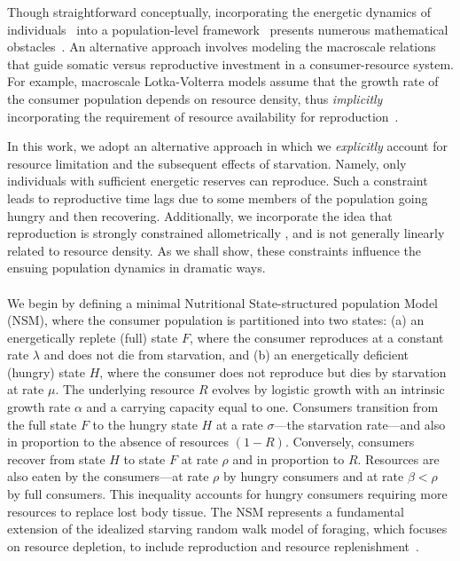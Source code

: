 \documentclass[11pt]{article}
\begin{document}
\begin{multicols}{2}
Though straightforward conceptually, incorporating the energetic dynamics of individuals~\cite{Kooi2000} into a population-level framework~\cite{Kooi2000,Sousa:2010ez} presents numerous mathematical obstacles~\cite{Diekmann:2010da}.  
An alternative approach involves modeling the macroscale relations that guide somatic versus reproductive investment in a consumer-resource system.
For example, macroscale Lotka-Volterra models assume that the growth rate of the consumer population depends on resource density, thus \emph{implicitly} incorporating the requirement of resource availability for reproduction~\cite{murdoch:2003}.

In this work, we adopt an alternative approach in which we \emph{explicitly} account for resource limitation and the subsequent effects of starvation.
Namely, only individuals with sufficient energetic reserves can reproduce.
Such a constraint leads to reproductive time lags due to some members of the population going hungry and then recovering.  
Additionally, we incorporate the idea that reproduction is strongly constrained allometrically \cite{Kempes:2012hy}, and is not generally linearly related to resource density.  
As we shall show, these constraints influence the ensuing population dynamics in dramatic ways.
\\

\\
We begin by defining a minimal Nutritional State-structured population Model (NSM), where the consumer population is partitioned into two states: (a) an energetically replete (full) state $F$, where the consumer reproduces at a constant rate $\lambda$ and does not die from starvation, and (b) an energetically deficient (hungry) state $H$, where the consumer does not reproduce but dies by starvation at rate $\mu$.  
The underlying resource $R$ evolves by logistic growth with an intrinsic growth rate $\alpha$ and a carrying capacity equal to one.  
Consumers transition from the full state $F$ to the hungry state $H$ at a rate $\sigma$---the starvation rate---and also in proportion to the absence of resources $(1-R)$.  Conversely, consumers recover from state $H$ to state $F$ at rate $\rho$ and in proportion to $R$. 
Resources are also eaten by the consumers---at rate $\rho$ by hungry consumers and at rate $\beta<\rho$ by full consumers.  
This inequality accounts for hungry consumers requiring more resources to replace lost body tissue.  
The NSM represents a fundamental extension of the idealized starving random walk model of foraging, which focuses on resource depletion, to include reproduction and resource replenishment~\cite{Benichou:2014wu,Benichou:2016wl,Chupeau:2016jf}.


\end{multicols}
\end{document}
